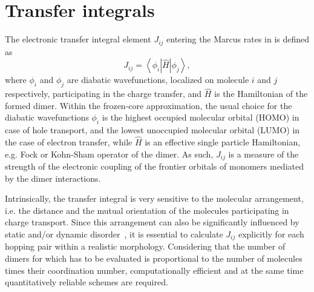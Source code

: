 \section{Transfer integrals }
\label{sec:transfer_integrals}

The electronic transfer integral element $J_{ij}$ entering the Marcus rates in  is defined as
\begin{equation}
   J_{ij} = \left\langle \phi_i \left\vert \hat{H} \right\vert \phi_j \right\rangle ,
\label{equ:TI}
\end{equation}
where $\phi_i$ and $\phi_j$ are diabatic wavefunctions, localized on molecule $i$ and $j$ respectively, participating in the charge transfer, and $\hat{H}$ is the Hamiltonian of the formed dimer. Within the frozen-core approximation, the usual choice for the diabatic wavefunctions $\phi_i$ is the highest occupied molecular orbital (HOMO) in case of hole transport, and the lowest unoccupied molecular orbital (LUMO) in the case of electron transfer, while $\hat{H}$ is an effective single particle Hamiltonian, e.g. Fock or Kohn-Sham operator of the dimer. As such, $J_{ij}$ is a measure of the strength of the electronic coupling of the frontier orbitals of monomers mediated by the dimer interactions. 

Intrinsically, the transfer integral is very sensitive to the molecular arrangement, i.e. the distance and the mutual orientation of the molecules participating in charge transport. Since this arrangement can also be significantly influenced by static and/or dynamic disorder~\cite{bassler_charge_1993,troisi_charge-transport_2006,troisi_charge_2009,mcmahon_organic_2010,vehoff_charge_2010},
it is essential to calculate $J_{ij}$ explicitly for each hopping pair within a realistic morphology. Considering that the number of dimers for which  has to be evaluated is proportional to the number of molecules times their coordination number, computationally efficient and at the same time quantitatively reliable schemes are required.






